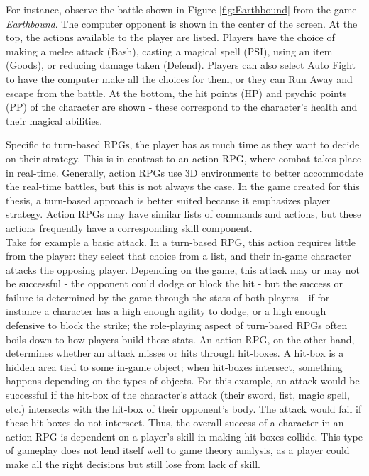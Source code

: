 For instance, observe the battle shown in Figure \ref{fig:Earthbound} from the game \textit{Earthbound}. The computer opponent is shown in the center of the screen. At the top, the actions available to the player are listed. Players have the choice of making a melee attack (Bash), casting a magical spell (PSI), using an item (Goods), or reducing damage taken (Defend). Players can also select Auto Fight to have the computer make all the choices for them, or they can Run Away and escape from the battle. At the bottom, the hit points (HP) and psychic points (PP) of the character are shown - these correspond to the character's health and their magical abilities.

Specific to turn-based RPGs, the player has as much time as they want to decide on their strategy. This is in contrast to an action RPG, where combat takes place in real-time. Generally, action RPGs use 3D environments to better accommodate the real-time battles, but this is not always the case. In the game created for this thesis, a turn-based approach is better suited because it emphasizes player strategy. Action RPGs may have similar lists of commands and actions, but these actions frequently have a corresponding skill component.\\

Take for example a basic attack. In a turn-based RPG, this action requires little from the player: they select that choice from a list, and their in-game character attacks the opposing player. Depending on the game, this attack may or may not be successful - the opponent could dodge or block the hit - but the success or failure is determined by the game through the stats of both players - if for instance a character has a high enough agility to dodge, or a high enough defensive to block the strike; the role-playing aspect of turn-based RPGs often boils down to how players build these stats. An action RPG, on the other hand, determines whether an attack misses or hits through hit-boxes. A hit-box is a hidden area tied to some in-game object; when hit-boxes intersect, something happens depending on the types of objects. For this example, an attack would be successful if the hit-box of the character's attack (their sword, fist, magic spell, etc.) intersects with the hit-box of their opponent's body. The attack would fail if these hit-boxes do not intersect. Thus, the overall success of a character in an action RPG is dependent on a player's skill in making hit-boxes collide. This type of gameplay does not lend itself well to game theory analysis, as a player could make all the right decisions but still lose from lack of skill.\\

